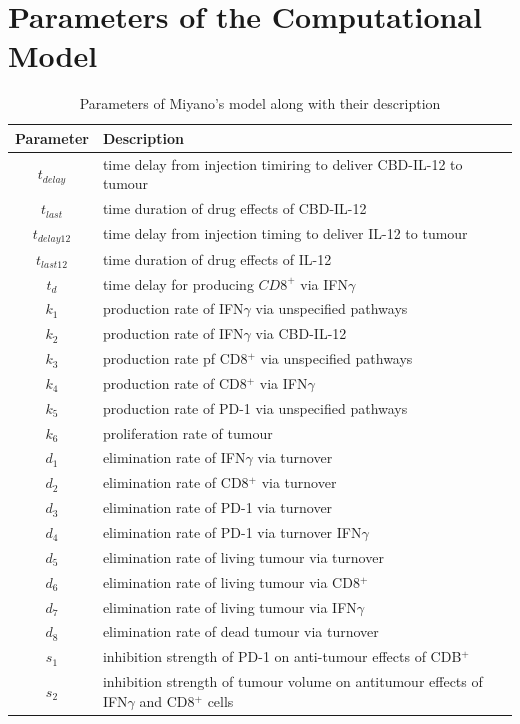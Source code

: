 \documentclass[11pt]{article}
\begin{document}
\clearpage
\newpage
\appendix
\section{Parameters of the Computational Model}\label{app}
\begin{table}[!h]
    \centering
    \caption{Parameters of Miyano's model along with their description}
    \begin{tabular}{c |l}
        \hline 
        Parameter & Description \\ \hline
        $t_{delay}$ & time delay from injection timiring to deliver CBD-IL-12 to tumour \\ 
        $t_{last}$ & time duration of drug effects of CBD-IL-12 \\ 
        $t_{delay12}$ & time delay from injection timing to deliver IL-12 to tumour \\
        $t_{last12}$ & time duration of drug effects of IL-12 \\ 
        $t_d$ & time delay for producing $CD8^+$ via IFN$\gamma$ \\ \hdashline
        $k_1$ & production rate of IFN$\gamma$ via unspecified pathways \\ 
        $k_2$ & production rate of IFN$\gamma$ via CBD-IL-12 \\ 
        $k_3$ & production rate pf CD8$^+$ via unspecified pathways \\ 
        $k_4$ & production rate of CD8$^+$ via IFN$\gamma$ \\ 
        $k_5$ & production rate of PD-1 via unspecified pathways \\ 
        $k_6$ & proliferation rate of tumour \\ \hdashline
        $d_1$ & elimination rate of IFN$\gamma$ via turnover \\
        $d_2$ & elimination rate of CD8$^+$ via turnover \\ 
        $d_3$ & elimination rate of PD-1 via turnover  \\ 
        $d_4$ & elimination rate of PD-1 via turnover IFN$\gamma$ \\ 
        $d_5$ & elimination rate of living tumour via turnover \\ 
        $d_6$ & elimination rate of living tumour via CD8$^+$ \\ 
        $d_7$ & elimination rate of living tumour via IFN$\gamma$ \\ 
        $d_8$ & elimination rate of dead tumour via turnover \\\hdashline
        $s_1$ & inhibition strength of PD-1 on anti-tumour effects of CDB$^+$ \\ 
        $s_2$ & inhibition strength of tumour volume on antitumour effects of IFN$\gamma$ and CD8$^+$ cells \\ \hline
    \end{tabular}
\end{table}

\clearpage
\newpage



\end{document}
